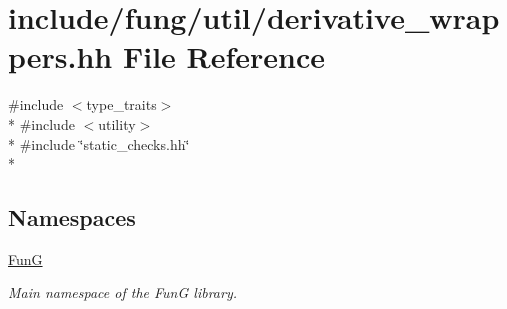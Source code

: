 \hypertarget{derivative__wrappers_8hh}{}\section{include/fung/util/derivative\+\_\+wrappers.hh File Reference}
\label{derivative__wrappers_8hh}
{\ttfamily \#include $<$type\+\_\+traits$>$}\\*
{\ttfamily \#include $<$utility$>$}\\*
{\ttfamily \#include \char`\"{}static\+\_\+checks.\+hh\char`\"{}}\\*
\subsection*{Namespaces}
\begin{DoxyCompactItemize}
\item 
 \hyperlink{namespaceFunG}{FunG}
\begin{DoxyCompactList}\small\item\em Main namespace of the FunG library. \end{DoxyCompactList}\end{DoxyCompactItemize}
